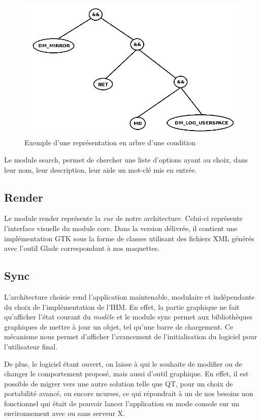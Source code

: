 ﻿\documentclass[16pts]{report}
\begin{document}
    \begin{figure}[H]
        \includegraphics[scale=0.5]{illustrations/condition_tree.png}
        \centering
        \caption{Exemple d'une représentation en arbre d'une condition}
        \label{fig:condTree}
    \end{figure}

    Le module search, permet de chercher une liste d'options ayant au choix,
    dans leur nom, leur description, leur aide un mot-clé mis en entrée.

    \subsection{Render}
    \label{sub:Render}
    Le module render représente la \textit{vue} de notre architecture.
    Celui-ci représente l'interface visuelle du module core.
    Dans la version délivrée, il contient une implémentation GTK sous la forme
    de classes utilisant des fichiers XML générés avec l'outil Glade
    correspondant à nos maquettes.

    \subsection{Sync}
    \label{sub:Sync}
    L'architecture choisie rend l'application maintenable, modulaire et
    indépendante du choix de l'implémentation de l'IHM. En effet, la partie
    graphique ne fait qu'afficher l'état courant du \textit{modèle} et
    le module sync permet aux bibliothèques graphiques de mettre à jour un
    objet, tel qu'une barre de chargement. Ce mécanisme nous permet d'afficher
    l'avancement de l'initialisation du logiciel pour l'utilisateur final.

    De plus, le logiciel étant ouvert, on laisse à qui le souhaite de modifier
    ou de changer le comportement proposé, mais aussi d'outil graphique.
    En effet, il est possible de migrer vers une autre solution telle que QT,
    pour un choix de portabilité avancé,  ou encore ncurses, ce qui répondrait
    à un de nos besoins non fonctionnel qui était de pouvoir lancer
    l'application en mode console sur un environnement avec ou sans serveur X.
\end{document}
